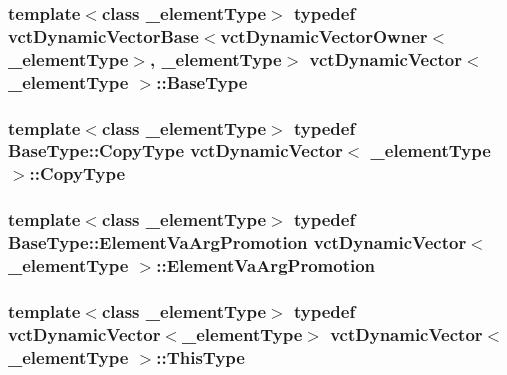 \subsubsection[{Base\+Type}]{\setlength{\rightskip}{0pt plus 5cm}template$<$class \+\_\+element\+Type$>$ typedef {\bf vct\+Dynamic\+Vector\+Base}$<${\bf vct\+Dynamic\+Vector\+Owner}$<$\+\_\+element\+Type$>$, \+\_\+element\+Type$>$ {\bf vct\+Dynamic\+Vector}$<$ \+\_\+element\+Type $>$\+::{\bf Base\+Type}}\label{classvct_dynamic_vector_aab0ea4a1ec16f7694beb39869ab780bf}
\hypertarget{classvct_dynamic_vector_a924a58839df36234b070c7d06f875079}{}
\subsubsection[{Copy\+Type}]{\setlength{\rightskip}{0pt plus 5cm}template$<$class \+\_\+element\+Type$>$ typedef {\bf Base\+Type\+::\+Copy\+Type} {\bf vct\+Dynamic\+Vector}$<$ \+\_\+element\+Type $>$\+::{\bf Copy\+Type}}\label{classvct_dynamic_vector_a924a58839df36234b070c7d06f875079}
\hypertarget{classvct_dynamic_vector_a7f290da80b23d4dd6bcc61d7db77aa75}{}
\subsubsection[{Element\+Va\+Arg\+Promotion}]{\setlength{\rightskip}{0pt plus 5cm}template$<$class \+\_\+element\+Type$>$ typedef {\bf Base\+Type\+::\+Element\+Va\+Arg\+Promotion} {\bf vct\+Dynamic\+Vector}$<$ \+\_\+element\+Type $>$\+::{\bf Element\+Va\+Arg\+Promotion}}\label{classvct_dynamic_vector_a7f290da80b23d4dd6bcc61d7db77aa75}
\hypertarget{classvct_dynamic_vector_a35327e01975af9fc9db8d93a4a27370f}{}
\subsubsection[{This\+Type}]{\setlength{\rightskip}{0pt plus 5cm}template$<$class \+\_\+element\+Type$>$ typedef {\bf vct\+Dynamic\+Vector}$<$\+\_\+element\+Type$>$ {\bf vct\+Dynamic\+Vector}$<$ \+\_\+element\+Type $>$\+::{\bf This\+Type}}\label{classvct_dynamic_vector_a35327e01975af9fc9db8d93a4a27370f}
\hypertarget{classvct_dynamic_vector_ad0c3e6e940b18c5c1d014aac726ad7de}{}
